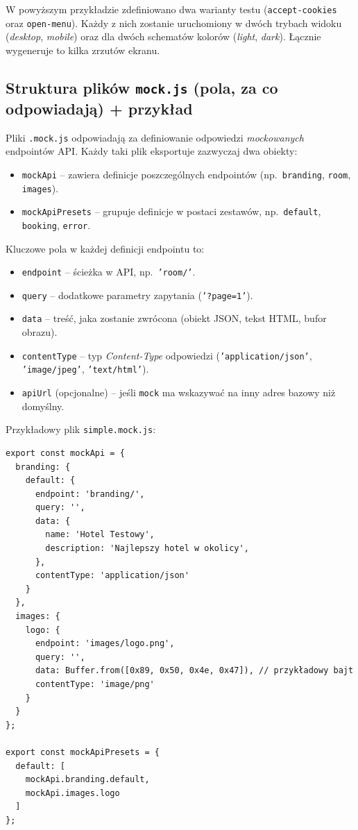 \documentclass[12pt]{report}
\begin{document}
W powyższym przykładzie zdefiniowano dwa warianty testu (\texttt{accept-cookies} oraz \texttt{open-menu}). Każdy z nich zostanie uruchomiony w dwóch trybach widoku (\emph{desktop}, \emph{mobile}) oraz dla dwóch schematów kolorów (\emph{light}, \emph{dark}). Łącznie wygeneruje to kilka zrzutów ekranu.

\subsection{Struktura plików \texttt{mock.js} (pola, za co odpowiadają) + przykład}
\label{sec:struktura-mockjs}
Pliki \texttt{.mock.js} odpowiadają za definiowanie odpowiedzi \emph{mockowanych} endpointów API. Każdy taki plik eksportuje zazwyczaj dwa obiekty:
\begin{itemize}
  \item \texttt{mockApi} -- zawiera definicje poszczególnych endpointów (np.~\texttt{branding}, \texttt{room}, \texttt{images}).
  \item \texttt{mockApiPresets} -- grupuje definicje w postaci zestawów, np.~\texttt{default}, \texttt{booking}, \texttt{error}.
\end{itemize}

\noindent Kluczowe pola w każdej definicji endpointu to:
\begin{itemize}
  \item \texttt{endpoint} -- ścieżka w API, np.~\texttt{'room/'}.
  \item \texttt{query} -- dodatkowe parametry zapytania (\texttt{'?page=1'}).  
  \item \texttt{data} -- treść, jaka zostanie zwrócona (obiekt JSON, tekst HTML, bufor obrazu).
  \item \texttt{contentType} -- typ \emph{Content-Type} odpowiedzi (\texttt{'application/json'}, \texttt{'image/jpeg'}, \texttt{'text/html'}).
  \item \texttt{apiUrl} (opcjonalne) -- jeśli \texttt{mock} ma wskazywać na inny adres bazowy niż domyślny.
\end{itemize}

\noindent Przykładowy plik \texttt{simple.mock.js}:

\begin{verbatim}
export const mockApi = {
  branding: {
    default: {
      endpoint: 'branding/',
      query: '',
      data: {
        name: 'Hotel Testowy',
        description: 'Najlepszy hotel w okolicy',
      },
      contentType: 'application/json'
    }
  },
  images: {
    logo: {
      endpoint: 'images/logo.png',
      query: '',
      data: Buffer.from([0x89, 0x50, 0x4e, 0x47]), // przykładowy bajt
      contentType: 'image/png'
    }
  }
};

export const mockApiPresets = {
  default: [
    mockApi.branding.default,
    mockApi.images.logo
  ]
};
\end{verbatim}
\end{document}
